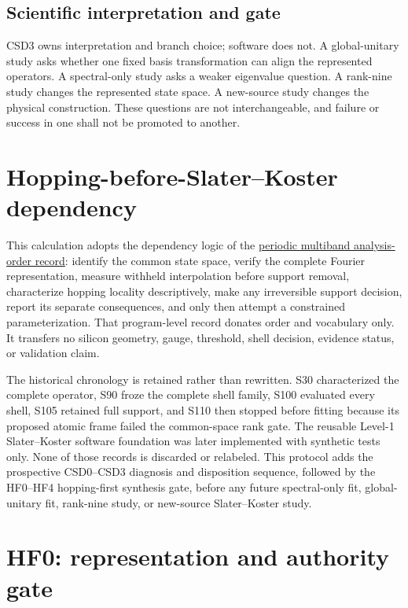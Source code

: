 \documentclass[11pt]{report}
\begin{document}
\section{Scientific interpretation and gate}

CSD3 owns interpretation and branch choice; software does not.  A global-unitary study
asks whether one fixed basis transformation can align the represented operators.  A
spectral-only study asks a weaker eigenvalue question.  A rank-nine study changes the
represented state space.  A new-source study changes the physical construction.  These
questions are not interchangeable, and failure or success in one shall not be promoted
to another.

\chapter{Hopping-before-Slater--Koster dependency}

This calculation adopts the dependency logic of the
\href{../../../periodic/multiband/analysis-order.md}{periodic multiband analysis-order
record}: identify the common state space, verify the complete Fourier representation,
measure withheld interpolation before support removal, characterize hopping locality
descriptively, make any irreversible support decision, report its separate
consequences, and only then attempt a constrained parameterization.  That program-level
record donates order and vocabulary only.  It transfers no silicon geometry, gauge,
threshold, shell decision, evidence status, or validation claim.

The historical chronology is retained rather than rewritten.  S30 characterized the
complete operator, S90 froze the complete shell family, S100 evaluated every shell,
S105 retained full support, and S110 then stopped before fitting because its proposed
atomic frame failed the common-space rank gate.  The reusable Level-1 Slater--Koster
software foundation was later implemented with synthetic tests only.  None of those
records is discarded or relabeled.  This protocol adds the prospective CSD0--CSD3
diagnosis and disposition sequence, followed by the HF0--HF4 hopping-first synthesis
gate, before any future spectral-only fit, global-unitary fit, rank-nine study, or
new-source Slater--Koster study.

\chapter{HF0: representation and authority gate}
\end{document}
